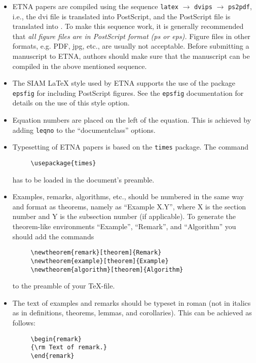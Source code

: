 \documentclass{scrartcl}
\begin{document}
\begin{itemize}
\item ETNA papers are compiled using the sequence \texttt{latex} $\rightarrow$
  \texttt{dvips} $\rightarrow$ \texttt{ps2pdf}, i.e., the dvi file is
  translated into PostScript, and the PostScript file is translated into \@PDF.
  To make this sequence work, it is generally recommended that \emph{all figure
    files are in PostScript format (ps or eps).} Figure files in other formats,
    e.g.  PDF, jpg, etc., are usually not acceptable. Before submitting a
    manuscript to ETNA, authors should make sure that the manuscript can be
    compiled in the above mentioned sequence.
%
\item The SIAM {\LaTeX} style used by ETNA supports the
use of the package \texttt{epsfig} for including PostScript figures. See
the \texttt{epsfig} documentation for details on the use of this style option.
%
\item Equation numbers are placed on the left of the equation. This is
achieved by adding \texttt{leqno} to the ``documentclass'' options.
%
\item Typesetting of ETNA papers is based on the \texttt{times} package.
The command
\begin{verbatim}     \usepackage{times}\end{verbatim}
has to be loaded in the document's preamble.
%
%
\item Examples, remarks, algorithms, etc., should be numbered in the
same way and format as theorems, namely as ``Example X.Y'', where X is the section
number and Y is the subsection number (if applicable). To generate the theorem-like
environments ``Example'', ``Remark'', and ``Algorithm'' you should add the commands
\begin{verbatim}
     \newtheorem{remark}[theorem]{Remark}
     \newtheorem{example}[theorem]{Example}
     \newtheorem{algorithm}[theorem]{Algorithm}
\end{verbatim}
to the preamble of your \TeX-file.
%
\item The text of examples and remarks should be typeset in roman (not in
  italics as in definitions, theorems, lemmas, and corollaries).  This can be
  achieved as follows:
\begin{verbatim}
     \begin{remark}
     {\rm Text of remark.}
     \end{remark}
\end{verbatim}

\end{itemize}
\end{document}
